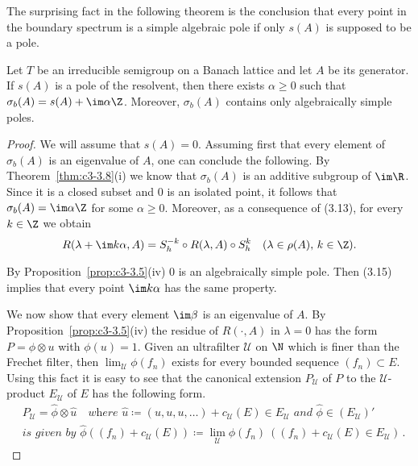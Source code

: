 The surprising fact in the following theorem is the conclusion that every point in the boundary spectrum is a simple algebraic pole if only $s(A)$ is supposed to be a pole.

\begin{theorem}\label{thm:c3-3.12}

Let $T$ be an irreducible semigroup on a Banach lattice and let $A$ be its generator.
If $s(A)$ is a pole of the resolvent, then there exists $\alpha \geq 0$ such that $\sigma_{b}(A) = s(A) + \im\alpha\Z$.
Moreover, $\sigma_{b}(A)$ contains only algebraically simple poles.
\end{theorem}

\begin{proof}
	We will assume that $s(A) = 0$.
	Assuming first that every element of $\sigma_{b}(A)$ is an eigenvalue of $A$, one can conclude the following.
	By Theorem~\ref{thm:c3-3.8}(i) we know that $\sigma_{b}(A)$ is an additive subgroup of $\im\R $.
	Since it is a closed subset and $0$ is an isolated point, it follows that $\sigma_{b}(A) = \im\alpha\Z$ for some $\alpha \geq 0$.
	Moreover, as a consequence of (3.13), for every $k \in \Z$ we obtain
	\begin{equation}\label{eq:c3-3.15}
		R(\lambda+\im k\alpha,A) = S_{h}^{-k}\circ R(\lambda,A)\circ S_{h}^{k} \quad (\lambda \in \rho(A),\, k \in \Z).
	\end{equation}
	
	By Proposition~\ref{prop:c3-3.5}(iv) $0$ is an algebraically simple pole.
	Then (3.15) implies that every point $\im k\alpha$ has the same property.
	
	We now show that every element $\im\beta$ is an eigenvalue of $A$.
	By Proposition~\ref{prop:c3-3.5}(iv) the residue of $R(\cdot,A)$ in $\lambda = 0$ has the form $P = \phi\otimes u$ with $\phi(u) = 1$.
	Given an ultrafilter $\mathcal{U}$ on $\N$ which is finer than the Frechet filter, then $\lim_{\mathcal{U}}\phi(f_{n})$ exists for every bounded sequence $(f_{n}) \subset E$.
	Using this fact it is easy to see that the canonical extension $P_{\mathcal{U}}$ of $P$ to the $\mathcal{U}$-product $E_{\mathcal{U}}$ of $E$ has the following form.
	\begin{equation}\label{eq:c3-3.16}
		\begin{aligned}
		&P_{\mathcal{U}} = \hat{\phi}\otimes\hat{u} \quad \textit{where } \hat{u} \coloneqq (u,u,u,\ldots)+c_{\mathcal{U}}(E) \in E_{\mathcal{U}} \textit{ and } \hat{\phi} \in (E_{\mathcal{U}})'
		\\
		&\textit{is given by } \hat{\phi}((f_{n})+c_{\mathcal{U}}(E)) \coloneqq \lim_{\mathcal{U}}\phi(f_{n}) \ ((f_{n})+c_{\mathcal{U}}(E) \in E_{\mathcal{U}})\,.
		\end{aligned}
	\end{equation}
	

\end{proof}
